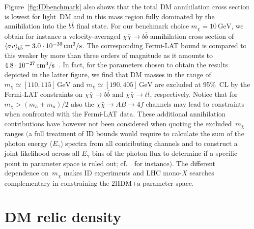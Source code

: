 \documentclass[review]{elsarticle}
\newcommand{\hdma}{\ensuremath{\textrm{2HDM+a}}\xspace}
\begin{document}
Figure~\ref{fig:IDbenchmark} also shows that the total DM annihilation cross section is lowest for light~DM and in this mass region fully dominated by the annihilation into the $b \bar b$ final state. For our benchmark choice $m_\chi = 10 \, {\mathrm{GeV}}$, we obtain  for instance a velocity-averaged $\chi \bar \chi \to b \bar b$ annihilation cross section   of  $\langle \sigma v \rangle_{b \bar b} = 3.0 \cdot 10^{-30} \, {\rm cm}^3/{\rm s}$. The corresponding Fermi-LAT bound is compared to this weaker by more than three orders of magnitude as it amounts to $4.8 \cdot 10^{-27} \, {\rm cm}^3/{\rm s}$~\cite{Fermi-LAT:2016uux}.  In fact, for the parameters chosen to obtain the results depicted in the latter figure, we find that DM masses in the range of $m_\chi \simeq [110, 115] \, {\mathrm{GeV}}$ and $m_\chi \simeq [190, 405] \, {\mathrm{GeV}}$ are excluded at 95\%~CL by the Fermi-LAT constraints on $\chi \bar \chi \to b \bar b$ and $\chi \bar \chi \to t \bar t$, respectively. Notice that for $m_\chi > (m_h + m_a)/2$ also the $\chi \bar \chi \to A B \to 4f$ channels may lead to constraints when confronted with the Fermi-LAT data. These additional annihilation contributions have however not been considered when quoting the excluded~$m_\chi$ ranges $\big($a full treatment of ID bounds would require to calculate the sum of the photon energy ($E_\gamma$) spectra  from all contributing channels and to construct a joint  likelihood across all $E_\gamma$ bins of the photon flux to determine if a specific point in parameter space is ruled out; cf.~\cite{Carpenter:2015xaa,Carpenter:2016thc}~for instance$\big)$. The different dependence on~$m_\chi$ makes ID experiments and LHC mono-$X$ searches    complementary in constraining the \hdma parameter space. 


\section{DM relic density}
\label{sec:relic}
\end{document}
